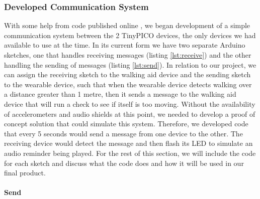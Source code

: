 {\subsubsection{Developed Communication System}

With some help from code published online \cite{random_nerd_tutorials}, we began development of a simple communication system between the 2 TinyPICO devices, the only devices we had available to use at the time. In its current form we have two separate Arduino sketches, one that handles receiving messages (listing \ref{lst:receive}) and the other handling the sending of messages (listing \ref{lst:send}). In relation to our project, we can assign the receiving sketch to the walking aid device and the sending sketch to the wearable device, such that when the wearable device detects walking over a distance greater than 1 metre, then it sends a message to the walking aid device that will run a check to see if itself is too moving. Without the availability of accelerometers and audio shields at this point, we needed to develop a proof of concept solution that could simulate this system. Therefore, we developed code that every 5 seconds would send a message from one device to the other. The receiving device would detect the message and then flash its LED to simulate an audio reminder being played. For the rest of this section, we will include the code for each sketch and discuss what the code does and how it will be used in our final product.

\paragraph{Send}



}
